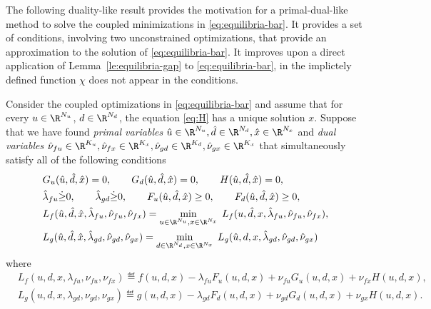 \documentclass[11pt]{article}
\begin{document}
The following duality-like result provides the motivation for a
primal-dual-like method to solve the coupled minimizations in
\eqref{eq:equilibria-bar}. It provides a set of conditions, involving
two unconstrained optimizations, that provide an approximation to the
solution of \eqref{eq:equilibria-bar}. It improves upon a direct
application of Lemma~\ref{le:equilibria-gap} to
\eqref{eq:equilibria-bar}, in the implictely defined function $\chi$ does
not appear in the conditions.



\begin{corollary}\label{co:equilibria-gap}
  Consider the coupled optimizations in \eqref{eq:equilibria-bar} and
  assume that for every $u\in\R^{N_u}$, $d\in\R^{N_d}$, the equation
  \eqref{eq:H} has a unique solution $x$.  Suppose that we have found
  \emph{primal variables} $\hat u\in\R^{N_u},\hat d\in\R^{N_d},\hat
  x\in\R^{N_x}$ and \emph{dual variables}
  $\hat\nu_{fu}\in\R^{K_u},\hat\nu_{fx}\in\R^{K_x},\hat\nu_{gd}\in\R^{K_d},\hat\nu_{gx}\in\R^{K_x}$
  that simultaneously satisfy all of the following conditions
  \begin{subequations}
    \begin{align}
      \label{eq:equality-constraints-ud-latent}
      &G_u(\hat u,\hat d,\hat x)=0, \qquad
      G_d(\hat u,\hat d,\hat x)=0, \qquad H(\hat u,\hat d,\hat x)=0, \\
      \label{eq:inequality-constraints-ud-latent}
      &\hat\lambda_{fu}\dot\ge0, \qquad \hat\lambda_{gd} \dot\ge 0, \qquad F_u(\hat u,\hat d,\hat x)\ge0,
      \qquad F_d(\hat u,\hat d,\hat x)\ge0,\\
      \label{eq:central-points-ud-latent-1}
      &L_f(\hat u,\hat d,\hat x,\hat\lambda_{fu},\hat\nu_{fu},\hat\nu_{fx})
      =\min_{u\in\R^{N_u},x\in\R^{N_x}}\; L_f(u,\hat d,x,\hat \lambda_{fu},\hat \nu_{fu},\hat\nu_{fx}), \\
      \label{eq:central-points-ud-latent-2}
      &L_g(\hat u,\hat d,\hat x,\hat\lambda_{gd},\hat\nu_{gd},\hat\nu_{gx})
      =\min_{d\in\R^{N_d},x\in\R^{N_x}}\; L_g(\hat u,d,x,\hat \lambda_{gd},\hat \nu_{gd},\hat\nu_{gx})
    \end{align}
  \end{subequations}
  where 
  \begin{align*}
    &L_f(u,d,x,\lambda_{fu},\nu_{fu},\nu_{fx})\eqdef f(u,d,x)-\lambda_{fu} F_u(u,d,x)+\nu_{fu} G_u(u,d,x)+\nu_{fx}H(u,d,x), \\
    &L_g(u,d,x,\lambda_{gd},\nu_{gd},\nu_{gx})\eqdef g(u,d,x)-\lambda_{gd} F_d(u,d,x)+\nu_{gd} G_d(u,d,x)+\nu_{gx}H(u,d,x).

\end{align*}
\end{corollary}
\end{document}
